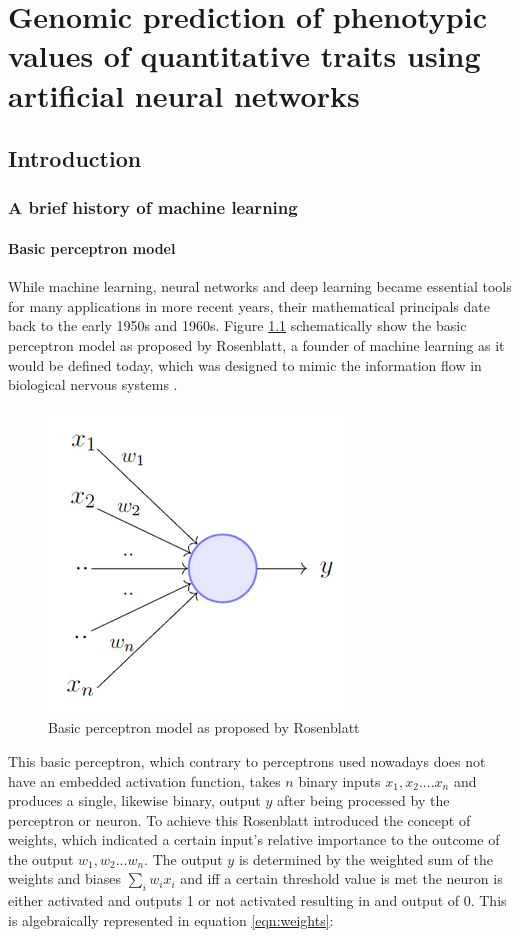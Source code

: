 \chapter{Genomic prediction of phenotypic values of quantitative traits using artificial neural networks}

\label{Chapter3} %


\section{Introduction}
\subsection{A brief history of machine learning} \label{introml}
\subsubsection{Basic perceptron model}

While machine learning, neural networks and deep learning became essential tools for many applications in more
recent years, their mathematical principals date back to the early 1950s and 1960s. Figure
\ref{fig:perceptron} schematically show the basic perceptron model as proposed by Rosenblatt, a founder of
machine learning as it would be defined today, which was designed to mimic the information flow in biological
nervous systems \cite{rosenblatt1961}.

\begin{figure}[th]
 \centering \includegraphics[height=.25\textheight, width=.5\textwidth]{Figures/perceptron.png} \decoRule
\caption[Basic perceptron model]{Basic perceptron model as proposed by Rosenblatt}
\label{fig:perceptron}
\end{figure}

This basic perceptron, which contrary to perceptrons used nowadays does not have an embedded activation
function, takes $n$ binary inputs $x_1 , x_2 .... x_n$ and produces a single, likewise binary, output $y$
after being processed by the perceptron or neuron. To achieve this Rosenblatt introduced the concept of
weights, which indicated a certain input's relative importance to the outcome of the output $w_1 , w_2 ... w_n$. The
output $y$ is determined by the weighted sum of the weights and biases $\sum_i w_ix_i $ and iff a certain
threshold value is met the neuron is either activated and outputs 1 or not activated resulting in and output
of 0. This is algebraically represented in equation \ref{eqn:weights}:

